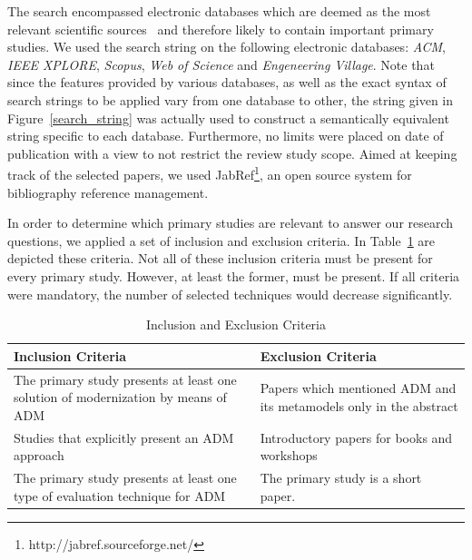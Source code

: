 The search encompassed electronic databases which are deemed as the most relevant scientific sources~\cite{Kitchenham} and therefore likely to contain important primary studies. We used the search string on the following electronic databases: \textit{ACM}, \textit{IEEE XPLORE}, \textit{Scopus}, \textit{Web of Science} and \textit{Engeneering Village}. Note that since the features provided by various databases, as well as the exact syntax of search strings to be applied vary from one database to other, the string given in Figure~\ref{search_string} was actually used to construct a semantically equivalent string specific to each database. Furthermore, no limits were placed on date of publication with a view to not restrict the review study scope. Aimed at keeping track of the selected papers, we used JabRef\footnote{http://jabref.sourceforge.net/}, an open source system for bibliography reference management. 



In order to determine which primary studies are relevant to answer our research questions, we applied a set of inclusion and exclusion criteria. In Table~\ref{tab:inclusion_exclusion_criteria} are depicted these criteria. Not all of these inclusion criteria must be present for every primary study. However, at least the former, must be present. If all criteria were mandatory, the number of selected techniques would decrease significantly.



\begin{table}
\centering
\caption{Inclusion and Exclusion Criteria\label{tab:inclusion_exclusion_criteria}}
\begin{tabularx}{
1.0\textwidth}{|X|X|}
\hline 
Inclusion Criteria & Exclusion Criteria\tabularnewline
\hline 
\hline 
The primary study presents at least one solution of modernization
by means of ADM & Papers which mentioned ADM and its metamodels only in the abstract\tabularnewline
\hline 
Studies that explicitly present an ADM approach & Introductory papers for books and workshops\tabularnewline
\hline 
The primary study presents at least one type of evaluation technique
for ADM & The primary study is a short paper.\tabularnewline
\hline 
\end{tabularx}
\end{table}

